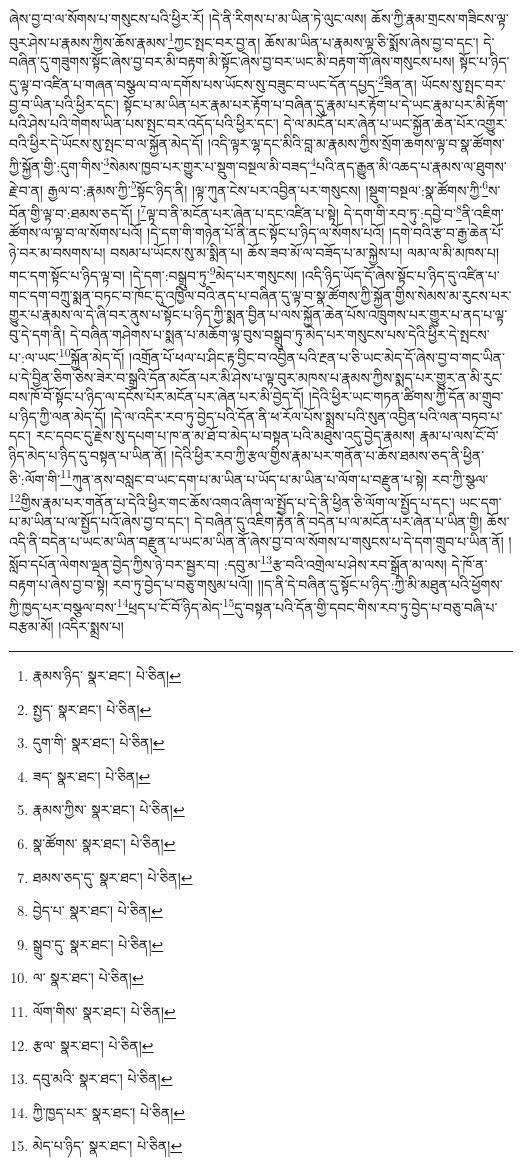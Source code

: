 ཞེས་བྱ་བ་ལ་སོགས་པ་གསུངས་པའི་ཕྱིར་རོ། །དེ་ནི་རིགས་པ་མ་ཡིན་ཏེ་ལུང་ལས། ཆོས་ཀྱི་རྣམ་གྲངས་གཟིངས་ལྟ་བུར་ཤེས་པ་རྣམས་ཀྱིས་ཆོས་རྣམས་\footnote{རྣམས་ཉིད་  སྣར་ཐང་།  པེ་ཅིན། }ཀྱང་སྤང་བར་བྱ་ན། ཆོས་མ་ཡིན་པ་རྣམས་ལྟ་ཅི་སྨོས་ཞེས་བྱ་བ་དང་། དེ་བཞིན་དུ་གཟུགས་སྟོང་ཞེས་བྱ་བར་མི་བརྟག་མི་སྟོང་ཞེས་བྱ་བར་ཡང་མི་བརྟག་གོ་ཞེས་གསུངས་པས། སྟོང་པ་ཉིད་དུ་ལྟ་བ་འཛིན་པ་གཞན་བསྩལ་བ་ལ་དགོས་པས་ཡོངས་སུ་བཟུང་བ་ཡང་དོན་དཔྱད་\footnote{སྤྱད་  སྣར་ཐང་།  པེ་ཅིན། }ཟིན་ན། ཡོངས་སུ་སྤང་བར་བྱ་བ་ཡིན་པའི་ཕྱིར་དང་། སྟོང་པ་མ་ཡིན་པར་རྣམ་པར་རྟོག་པ་བཞིན་དུ་རྣམ་པར་རྟོག་པ་དེ་ཡང་རྣམ་པར་མི་རྟོག་པའི་ཤེས་པའི་གེགས་ཡིན་པས་སྤང་བར་འདོད་པའི་ཕྱིར་དང་། དེ་ལ་མངོན་པར་ཞེན་པ་ཡང་སྐྱོན་ཆེན་པོར་འགྱུར་བའི་ཕྱིར་དེ་ཡོངས་སུ་སྤང་བ་ལ་སྐྱོན་མེད་དོ། །འདི་ལྟར་ལྷ་དང་མིའི་བླ་མ་རྣམས་ཀྱིས་སྲོག་ཆགས་ལྟ་བ་སྣ་ཚོགས་ཀྱི་སྐྱོན་གྱི་:དུག་གིས་\footnote{དུག་གི་  སྣར་ཐང་།  པེ་ཅིན། }སེམས་ཁྱབ་པར་གྱུར་པ་སྡུག་བསྔལ་མི་བཟད་\footnote{ཟད་  སྣར་ཐང་།  པེ་ཅིན། }པའི་ནད་རྒྱུན་མི་འཆད་པ་རྣམས་ལ་ཐུགས་རྗེ་བ་ན། རྒྱལ་བ་:རྣམས་ཀྱི་\footnote{རྣམས་ཀྱིས་  སྣར་ཐང་།  པེ་ཅིན། }སྟོང་ཉིད་ནི། །ལྟ་ཀུན་ངེས་པར་འབྱིན་པར་གསུངས། །སྡུག་བསྔལ་:སྣ་ཚོགས་ཀྱི་\footnote{སྣ་ཚོགས་  སྣར་ཐང་།  པེ་ཅིན། }ས་བོན་གྱི་ལྟ་བ་:ཐམས་ཅད་དོ། །\footnote{ཐམས་ཅད་དུ་  སྣར་ཐང་།  པེ་ཅིན། }ལྟ་བ་ནི་མངོན་པར་ཞེན་པ་དང་འཛིན་པ་སྟེ། དེ་དག་གི་རབ་ཏུ་:དབྱེ་བ་\footnote{བྱེད་པ་  སྣར་ཐང་།  པེ་ཅིན། }ནི་འཇིག་ཚོགས་ལ་ལྟ་བ་ལ་སོགས་པའོ། །དེ་དག་གི་གཉེན་པོ་ནི་ནང་སྟོང་པ་ཉིད་ལ་སོགས་པའོ། །དགེ་བའི་རྩ་བ་རྒྱ་ཆེན་པོ་ཉེ་བར་མ་བསགས་པ། བསམ་པ་ཡོངས་སུ་མ་སྨིན་པ། ཆོས་ཟབ་མོ་ལ་བཟོད་པ་མ་སྐྱེས་པ། ལམ་ལ་མི་མཁས་པ། གང་དག་སྟོང་པ་ཉིད་ལྟ་བ། །དེ་དག་:བསྒྲུབ་ཏུ་\footnote{སྒྲུབ་དུ་  སྣར་ཐང་།  པེ་ཅིན། }མེད་པར་གསུངས། །འདི་ཉིད་ཡོད་དོ་ཞེས་སྟོང་པ་ཉིད་དུ་འཛིན་པ་གང་དག་བཀྲུ་སྨན་བཏང་བ་ཁོང་དུ་འཁྱིལ་བའི་ནད་པ་བཞིན་དུ་ལྟ་བ་སྣ་ཚོགས་ཀྱི་སྐྱོན་གྱིས་སེམས་མ་རུངས་པར་གྱུར་པ་རྣམས་ལ་དེ་ཞི་བར་ནུས་པ་སྟོང་པ་ཉིད་ཀྱི་སྨན་བྱིན་པ་ལས་སྐྱོན་ཆེན་པོས་འཁྲུགས་པར་གྱུར་པ་ནད་པ་ལྟ་བུ་དེ་དག་ནི། དེ་བཞིན་གཤེགས་པ་སྨན་པ་མཆོག་ལྟ་བུས་བསྒྲུབ་ཏུ་མེད་པར་གསུངས་པས་དེའི་ཕྱིར་དེ་སྤངས་པ་:ལ་ཡང་\footnote{ལ་  སྣར་ཐང་།  པེ་ཅིན། }སྐྱོན་མེད་དོ། །འགྲོན་པོ་ཕལ་པ་ཤིང་རྟ་བྱིང་བ་འབྱིན་པའི་རྔན་པ་ཅི་ཡང་མེད་དོ་ཞེས་བྱ་བ་གང་ཡིན་པ་དེ་བྱིན་ཅིག་ཅེས་ཟེར་བ་སྒྲའི་དོན་མངོན་པར་མི་ཤེས་པ་ལྟ་བུར་མཁས་པ་རྣམས་ཀྱིས་སྨད་པར་གྱུར་ན་མི་རུང་བས་ཁོ་བོ་སྟོང་པ་ཉིད་ལ་དངོས་པོར་མངོན་པར་ཞེན་པར་མི་བྱེད་དོ། །དེའི་ཕྱིར་ཡང་གཏན་ཚིགས་ཀྱི་དོན་མ་གྲུབ་པ་ཉིད་ཀྱི་ལན་མེད་དོ། །དེ་ལ་འདིར་རབ་ཏུ་བྱེད་པའི་དོན་ནི་ཕ་རོལ་པོས་སྨྲས་པའི་སུན་འབྱིན་པའི་ལན་བཏབ་པ་དང་། རང་དབང་དུ་རྗེས་སུ་དཔག་པ་ཁ་ན་མ་ཐོ་བ་མེད་པ་བསྟན་པའི་མཐུས་འདུ་བྱེད་རྣམས། རྣམ་པ་ལས་ངོ་བོ་ཉིད་མེད་པ་ཉིད་དུ་བསྟན་པ་ཡིན་ནོ། །དེའི་ཕྱིར་རབ་ཀྱི་རྩལ་གྱིས་རྣམ་པར་གནོན་པ་ཆོས་ཐམས་ཅད་ནི་ཕྱིན་ཅི་:ལོག་གི་\footnote{ལོག་གིས་  སྣར་ཐང་།  པེ་ཅིན། }ཀུན་ནས་བསླང་བ་ཡང་དག་པ་མ་ཡིན་པ་ཡོད་པ་མ་ཡིན་པ་ལོག་པ་བརྫུན་པ་སྟེ། རབ་ཀྱི་སྩལ་\footnote{རྩལ་  སྣར་ཐང་།  པེ་ཅིན། }གྱིས་རྣམ་པར་གནོན་པ་དེའི་ཕྱིར་གང་ཆོས་འགའ་ཞིག་ལ་སྤྱོད་པ་དེ་ནི་ཕྱིན་ཅི་ལོག་ལ་སྤྱོད་པ་དང་། ཡང་དག་པ་མ་ཡིན་པ་ལ་སྤྱོད་པའོ་ཞེས་བྱ་བ་དང་། དེ་བཞིན་དུ་འཇིག་རྟེན་ནི་བདེན་པ་ལ་མངོན་པར་ཞེན་པ་ཡིན་གྱི། ཆོས་འདི་ནི་བདེན་པ་ཡང་མ་ཡིན་བརྫུན་པ་ཡང་མ་ཡིན་ནོ་ཞེས་བྱ་བ་ལ་སོགས་པ་གསུངས་པ་དེ་དག་གྲུབ་པ་ཡིན་ནོ། །སློབ་དཔོན་ལེགས་ལྡན་བྱེད་ཀྱིས་ཉེ་བར་སྦྱར་བ། :དབུ་མ་\footnote{དབུ་མའི་  སྣར་ཐང་།  པེ་ཅིན། }རྩ་བའི་འགྲེལ་པ་ཤེས་རབ་སྒྲོན་མ་ལས། དེ་ཁོ་ན་བརྟག་པ་ཞེས་བྱ་བ་སྟེ། རབ་ཏུ་བྱེད་པ་བཅུ་གསུམ་པའོ།། །།ད་ནི་དེ་བཞིན་དུ་སྟོང་པ་ཉིད་:ཀྱི་མི་མཐུན་པའི་ཕྱོགས་ཀྱི་ཁྱད་པར་བསྩལ་བས་\footnote{ཀྱི་ཁྱད་པར་  སྣར་ཐང་།  པེ་ཅིན། }ཕྲད་པ་ངོ་བོ་ཉིད་མེད་\footnote{མེད་པ་ཉིད་  སྣར་ཐང་།  པེ་ཅིན། }དུ་བསྟན་པའི་དོན་གྱི་དབང་གིས་རབ་ཏུ་བྱེད་པ་བཅུ་བཞི་པ་བརྩམ་མོ། །འདིར་སྨྲས་པ། 
